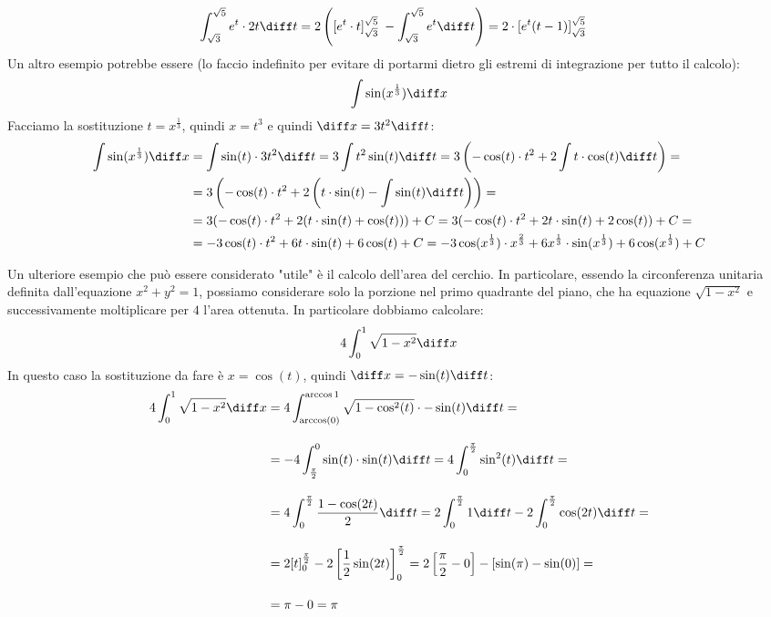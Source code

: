 \begin{align*}
	\int_{\sqrt{3}}^{\sqrt{5}} e^t \cdot 2t \diff t &= 2\left( 
    [e^t \cdot t]_{\sqrt{3}}^{\sqrt{5}} \;- \int_{\sqrt{3}}^{\sqrt{5}} e^t 
    \diff t\right) = 2 \cdot [e^t (t - 1)]_{\sqrt{3}}^{\sqrt{5}}
\end{align*}
Un altro esempio potrebbe essere (lo faccio indefinito per evitare di portarmi 
dietro gli estremi di integrazione per tutto il calcolo):
\begin{align*}
	\int \sin(x^{\frac{1}{3}}) \diff x
\end{align*}
Facciamo la sostituzione $t = x^{\frac{1}{3}}$, quindi $x = t^3$ e quindi 
$\diff x = 3 t^2 \diff t$:
\begin{align*}
	\int \sin(x^{\frac{1}{3}}) \diff x &= \int \sin(t) \cdot 3t^2 \diff t = 3 
    \int t^2 \sin(t) \diff t = 3 \left(-\cos(t) \cdot t^2 + 2\int t \cdot 
    \cos(t) \diff t \right) =\\
	&= 3 \left(-\cos(t) \cdot t^2 + 2\left(t \cdot \sin(t) - \int \sin(t) 
    \diff t \right)\right) =\\
	&= 3 (-\cos(t) \cdot t^2 + 2(t \cdot \sin(t) + \cos (t) )) + C = 3 
    (-\cos(t) \cdot t^2 + 2t \cdot \sin(t) + 2\cos (t) ) + C=\\
	&= -3\cos(t) \cdot t^2 + 6t \cdot \sin(t) + 6\cos (t) + C =  -3\cos(x^{
        \frac{1}{3}}) \cdot x^{\frac{2}{3}} + 6x^{\frac{1}{3}} \cdot \sin(
    x^\frac{1}{3}) + 6\cos (x^\frac{1}{3}) + C
\end{align*}

Un ulteriore esempio che può essere considerato "utile" è il calcolo dell'area 
del cerchio. In particolare, essendo la circonferenza unitaria definita 
dall'equazione $x^2 + y^2 = 1$, possiamo considerare solo la porzione nel primo 
quadrante del piano, che ha equazione $\sqrt{1-x^2}$ e successivamente 
moltiplicare per $4$ l'area ottenuta. In particolare dobbiamo calcolare:
\begin{equation*}
	4 \int_0^1 \sqrt{1-x^2} \diff x
\end{equation*}
In questo caso la sostituzione da fare è $x = \cos(t)$, quindi $\diff x = 
-\sin(t) \diff t$:
\begin{align*}
	4 \int_0^1 \sqrt{1-x^2} \diff x &= 4 \int_{\arccos(0)}^{\arccos{1}} 
    \sqrt{1-\cos^2(t)} \cdot - \sin(t) \diff t = \\[10pt]
	&= -4 \int_{\frac{\pi}{2}}^0 \sin(t) \cdot \sin(t) \diff t = 4 
    \int_0^{\frac{\pi}{2}} \sin^2(t)\diff t = \\[10pt]
	&= 4 \int_0^{\frac{\pi}{2}} \dfrac{1 - \cos(2t)}{2}\diff t = 2 
    \int_0^{\frac{\pi}{2}} 1 \diff t - 2 \int_0^{\frac{\pi}{2}} \cos(2t) 
    \diff t = \\[10pt]
	&= 2[t]_0^{\frac{\pi}{2}} - 2\left[\dfrac{1}{2} \sin(2t) \right]_0^{
        \frac{\pi}{2}} = 2 \left[\dfrac{\pi}{2} - 0\right] - [\sin(\pi) - 
    \sin(0)] = \\[10pt]
	&= \pi - 0 = \pi
\end{align*}

